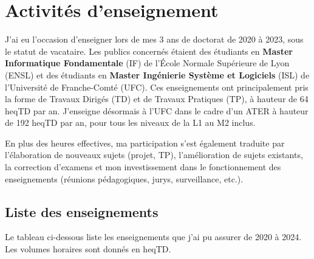 \documentclass[12pt]{article}
\begin{document}
\section{Activités d'enseignement}

J'ai eu l'occasion d'enseigner lors de mes 3 ans de doctorat de 2020 à 2023, sous le statut de
vacataire.  
Les publics concernés étaient des étudiants en \textbf{Master Informatique Fondamentale} (IF) de
l'École Normale Supérieure de Lyon (ENSL) et des étudiants en \textbf{Master Ingénierie Système et
Logiciels} (ISL) de l'Université de Franche-Comté (UFC).  
Ces enseignements ont principalement pris la forme de Travaux Dirigés (TD) et de Travaux Pratiques
(TP), à hauteur de 64 heqTD par an.  
J'enseigne désormais à l'UFC dans le cadre d'un ATER à hauteur de 192 heqTD par an, pour tous les
niveaux de la L1 au M2 inclus.

En plus des heures effectives, ma participation s'est également traduite par l'élaboration de
nouveaux sujets (projet, TP), l'amélioration de sujets existants, la correction d'examens et mon
investissement dans le fonctionnement des enseignements (réunions pédagogiques, jurys, surveillance,
etc.).


\subsection{Liste des enseignements}

Le tableau ci-dessous liste les enseignements que j'ai pu assurer de 2020 à 2024.  
Les volumes horaires sont donnés en heqTD.
\end{document}
